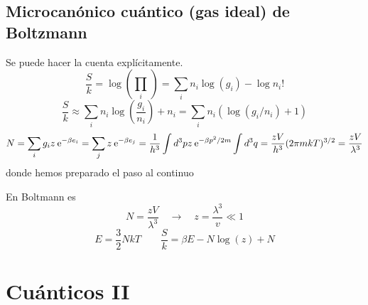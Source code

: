 \documentclass[10pt,oneside]{CBFT_book}
\begin{document}
\subsection{Microcanónico cuántico (gas ideal) de Boltzmann}

Se puede hacer la cuenta explícitamente.
\[
	\frac{S}{k} = \log \left( \prod_i \frac{}{} \right) =
	\sum_i n_i \log (g_i) - \log n_i!
\]
\[
	\frac{S}{k} \approx 	\sum_i n_i \log \left(\frac{g_i}{n_i}\right) + n_i =
	\sum_i n_i \left( \log (g_i/n_i) + 1 \right)
\]
\[
	N = \sum_i g_i z \:\mathrm{e}^{-\beta e_i} = \sum_j z\:\mathrm{e}^{-\beta e_j} =
	\frac{1}{h^3} \int d^3p z \:\mathrm{e}^{-\beta p^2 / 2m } \int d^3 q =
	\frac{zV}{h^3} (2\pi m k T)^{3/2} = \frac{zV}{\lambda^3}
\]
donde hemos preparado el paso al continuo

En Boltmann es 
\[
	N = \frac{zV}{\lambda^3} \quad \rightarrow \quad z = \frac{\lambda^3}{v} \ll 1 
\]
\[
	E = \frac{3}{2}NkT \qquad \frac{S}{k} = \beta E - N \log( z ) + N
\]


\section{Cuánticos II}
\end{document}
